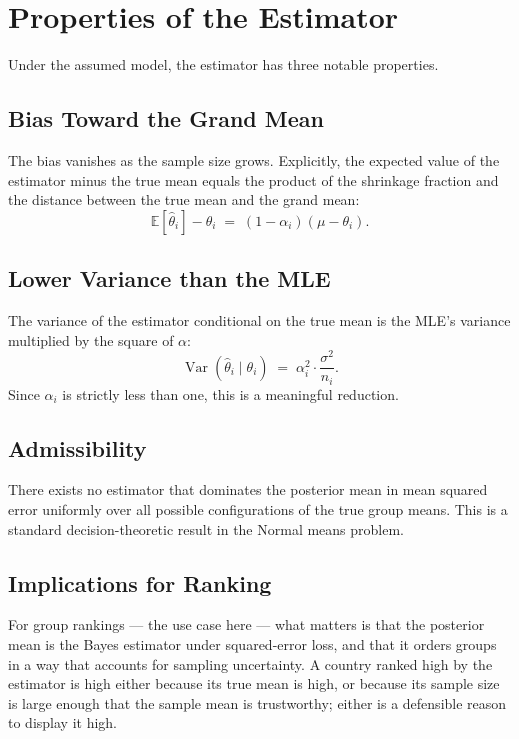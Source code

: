 \documentclass[11pt]{article}
\begin{document}
\section{Properties of the Estimator}

Under the assumed model, the estimator has three notable properties.

\subsection{Bias Toward the Grand Mean}

The bias vanishes as the sample size grows. Explicitly, the expected
value of the estimator minus the true mean equals the product of the
shrinkage fraction and the distance between the true mean and the grand
mean:
\[
    \mathbb{E}[\hat{\theta}_i] - \theta_i \;=\; (1 - \alpha_i)(\mu - \theta_i).
\]

\subsection{Lower Variance than the MLE}

The variance of the estimator conditional on the true mean is the MLE's
variance multiplied by the square of $\alpha$:
\[
    \operatorname{Var}(\hat{\theta}_i \mid \theta_i) \;=\; \alpha_i^2 \cdot \frac{\sigma^2}{n_i}.
\]
Since $\alpha_i$ is strictly less than one, this is a meaningful
reduction.

\subsection{Admissibility}

There exists no estimator that dominates the posterior mean in mean
squared error uniformly over all possible configurations of the true
group means. This is a standard decision-theoretic result in the Normal
means problem.

\subsection{Implications for Ranking}

For group rankings --- the use case here --- what matters is that the
posterior mean is the Bayes estimator under squared-error loss, and that
it orders groups in a way that accounts for sampling uncertainty. A
country ranked high by the estimator is high either because its true
mean is high, or because its sample size is large enough that the
sample mean is trustworthy; either is a defensible reason to display it
high.
\end{document}
